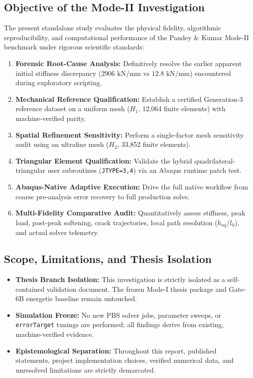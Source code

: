 \documentclass[11pt,a4paper]{article}
\begin{document}
\subsection{Objective of the Mode-II Investigation}
The present standalone study evaluates the physical fidelity, algorithmic reproducibility, and computational performance of the Pandey \& Kumar Mode-II benchmark under rigorous scientific standards:
\begin{enumerate}[leftmargin=*]
    \item \textbf{Forensic Root-Cause Analysis:} Definitively resolve the earlier apparent initial stiffness discrepancy ($2906\text{ kN/mm}$ vs $12.8\text{ kN/mm}$) encountered during exploratory scripting.
    \item \textbf{Mechanical Reference Qualification:} Establish a certified Generation-3 reference dataset on a uniform mesh ($H_1$, 12,064 finite elements) with machine-verified parity.
    \item \textbf{Spatial Refinement Sensitivity:} Perform a single-factor mesh sensitivity audit using an ultrafine mesh ($H_2$, 33,852 finite elements).
    \item \textbf{Triangular Element Qualification:} Validate the hybrid quadrilateral-triangular user subroutines (\texttt{JTYPE=3,4}) via an Abaqus runtime patch test.
    \item \textbf{Abaqus-Native Adaptive Execution:} Drive the full native workflow from coarse pre-analysis error recovery to full production solve.
    \item \textbf{Multi-Fidelity Comparative Audit:} Quantitatively assess stiffness, peak load, post-peak softening, crack trajectories, local path resolution ($h_{\mathrm{eq}}/l_0$), and actual solver telemetry.
\end{enumerate}

\subsection{Scope, Limitations, and Thesis Isolation}
\begin{itemize}[leftmargin=*]
    \item \textbf{Thesis Branch Isolation:} This investigation is strictly isolated as a self-contained validation document. The frozen Mode-I thesis package and Gate-6B energetic baseline remain untouched.
    \item \textbf{Simulation Freeze:} No new PBS solver jobs, parameter sweeps, or \texttt{errorTarget} tunings are performed; all findings derive from existing, machine-verified evidence.
    \item \textbf{Epistemological Separation:} Throughout this report, published statements, project implementation choices, verified numerical data, and unresolved limitations are strictly demarcated.
\end{itemize}
\end{document}
